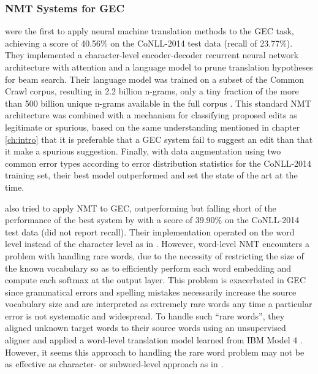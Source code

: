 \subsubsection{NMT Systems for GEC}
\citet{Xie2016NeuralAttention} were the first to apply neural machine translation methods to the GEC task, achieving a score of 40.56\% on the CoNLL-2014 test data (recall of 23.77\%). They implemented a character-level encoder-decoder recurrent neural network architecture with attention and a language model to prune translation hypotheses for beam search. Their language model was trained on a subset of the Common Crawl corpus, resulting in 2.2 billion n-grams, only a tiny fraction of the more than 500 billion unique n-grams available in the full corpus \citep{Buck2014NCrawl}. This standard NMT architecture was combined with a mechanism for classifying proposed edits as legitimate or spurious, based on the same understanding mentioned in chapter \ref{ch:intro} that it is preferable that a GEC system fail to suggest an edit than that it make a spurious suggestion. Finally, with data augmentation using two common error types according to error distribution statistics for the CoNLL-2014 training set, their best model outperformed \citet{Susanto2014SystemCorrection} and set the state of the art at the time.

\citet{Yuan2016GrammaticalTranslation} also tried to apply NMT to GEC, outperforming \citet{Susanto2014SystemCorrection} but falling short of the performance of the best system by \citet{Xie2016NeuralAttention} with a score of 39.90\% on the CoNLL-2014 test data (did not report recall). Their implementation operated on the word level instead of the character level as in \citet{Xie2016NeuralAttention}. However, word-level NMT encounters a problem with handling rare words, due to the necessity of restricting the size of the known vocabulary so as to efficiently perform each word embedding and compute each softmax at the output layer. This problem is exacerbated in GEC since grammatical errors and spelling mistakes necessarily increase the source vocabulary size and are interpreted as extremely rare words any time a particular error is not systematic and widespread. To handle such ``rare words'', they aligned unknown target words to their source words using an unsupervised aligner and applied a word-level translation model learned from IBM Model 4 \citep{Brown1993TheEstimation}. However, it seems this approach to handling the rare word problem may not be as effective as character- or subword-level approach as in \citet{Xie2016NeuralAttention}. %